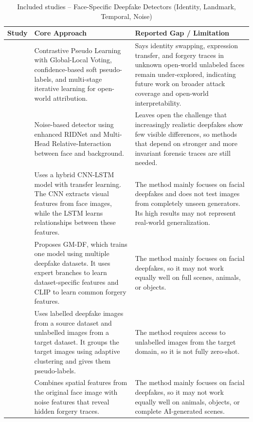 \documentclass[sn-mathphys-num,Numbered,pdflatex]{sn-jnl}
\begin{document}
\begin{table}[htbp]
\caption{Included studies -- Face-Specific Deepfake Detectors (Identity, Landmark, Temporal, Noise)}
\label{tab:face_specific}
\centering\footnotesize
\begin{tabularx}{\columnwidth}{@{}p{} X X@{}}
\toprule
\textbf{Study} & \textbf{Core Approach} & \textbf{Reported Gap / Limitation} \\
\midrule
\cite{ContrastivePseudo1} & Contrastive Pseudo Learning with Global-Local Voting, confidence-based soft pseudo-labels, and multi-stage iterative learning for open-world attribution. & Says identity swapping, expression transfer, and forgery traces in unknown open-world unlabeled faces remain under-explored, indicating future work on broader attack coverage and open-world interpretability. \\
\cite{NoiseBased5} & Noise-based detector using enhanced RIDNet and Multi-Head Relative-Interaction between face and background. & Leaves open the challenge that increasingly realistic deepfakes show few visible differences, so methods that depend on stronger and more invariant forensic traces are still needed. \\
\cite{AHybrid26} & Uses a hybrid CNN-LSTM model with transfer learning. The CNN extracts visual features from face images, while the LSTM learns relationships between these features. & The method mainly focuses on facial deepfakes and does not test images from completely unseen generators. Its high results may not represent real-world generalization. \\
\cite{GmdfGeneralized37} & Proposes GM-DF, which trains one model using multiple deepfake datasets. It uses expert branches to learn dataset-specific features and CLIP to learn common forgery features. & The method mainly focuses on facial deepfakes, so it may not work equally well on full scenes, animals, or objects. \\
\cite{FinegrainedOpenset38} & Uses labelled deepfake images from a source dataset and unlabelled images from a target dataset. It groups the target images using adaptive clustering and gives them pseudo-labels. & The method requires access to unlabelled images from the target domain, so it is not fully zero-shot. \\
\cite{FaceForgery39} & Combines spatial features from the original face image with noise features that reveal hidden forgery traces. & The method mainly focuses on facial deepfakes, so it may not work equally well on animals, objects, or complete AI-generated scenes. \\

\end{tabularx}
\end{table}
\end{document}
